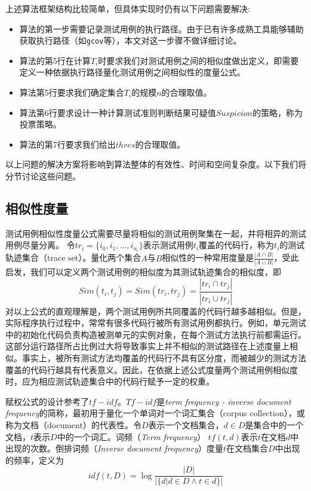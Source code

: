 上述算法框架结构比较简单，但具体实现时仍有以下问题需要解决:
\begin{itemize}
	\item 算法的第一步需要记录测试用例的执行路径。由于已有许多成熟工具能够辅助获取执行路径（如\texttt{gcov}等），本文对这一步骤不做详细讨论。
	\item 算法的第5行在计算$T_i$时要求我们对测试用例之间的相似度做出定义，即需要定义一种依据执行路径量化测试用例之间相似性的度量公式。
	\item 算法第5行要求我们确定集合$T_i$的规模$n$的合理取值。
	\item 算法第6行要求设计一种计算测试准则判断结果可疑值$Suspicion$的策略，称为投票策略。
	\item 算法的第7行要求我们给出$thres$的合理取值。
\end{itemize}
以上问题的解决方案将影响到算法整体的有效性、时间和空间复杂度。以下我们将分节讨论这些问题。

\subsection{相似性度量}

测试用例相似性度量公式需要尽量将相似的测试用例聚集在一起，并将相异的测试用例尽量分离。
令${tr}_i = \{i_0, i_1, \ldots, i_{n_i}\}$表示测试用例$t_i$覆盖的代码行，称为$t_i$的测试轨迹集合（trace set）。量化两个集合$A$与$B$相似性的一种常用度量是$\frac{|A \cap B|}{|A \cup B|}$，受此启发，我们可以定义两个测试用例的相似度为其测试轨迹集合的相似度，即
$$
Sim(t_i, t_j) = Sim({tr}_i, {tr}_j) =\frac{|{tr}_i \cap {tr}_j|}{|{tr}_i \cup {tr}_j|}
$$
对以上公式的直观理解是，两个测试用例所共同覆盖的代码行越多越相似。但是，实际程序执行过程中，常常有很多代码行被所有测试用例都执行。例如，单元测试中的初始化代码负责构造被测单元的实例对象，在每个测试方法执行前都需运行。这部分运行路径所占比例过大将导致事实上并不相似的测试路径在上述度量上相似。事实上，被所有测试方法均覆盖的代码行不具有区分度，而被越少的测试方法覆盖的代码行越具有代表意义。因此，在依据上述公式度量两个测试用例相似度时，应为相应测试轨迹集合中的代码行赋予一定的权重。

赋权公式的设计参考了$tf-idf$\cite{wiki:tf-idf}。$Tf-idf$是\textit{term frequency - inverse document frequency}的简称，最初用于量化一个单词对一个词汇集合（corpus collection），或称为文档（document）的代表性。令$D$表示一个文档集合，$d \in D$是集合中的一个文档，$t$表示$D$中的一个词汇。词频（\textit{Term frequency}） $tf(t, d)$表示$t$在文档$d$中出现的次数。倒排词频（\textit{Inverse document frequency}）度量$t$在文档集合$D$中出现的频率，定义为
$$
idf(t, D) = \log{\frac{|D|}{|\{d| d \in D \wedge t \in d\}|}}
$$

